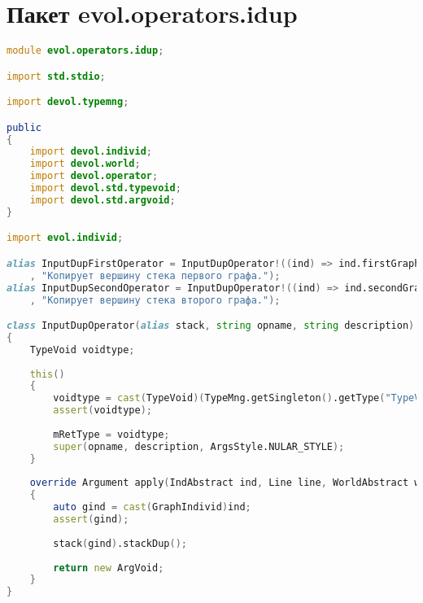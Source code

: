 \documentclass[russian,utf8,emptystyle]{eskdtext}
\begin{document}
\section{Пакет evol.operators.idup}
\begin{lstlisting}[language=D]
module evol.operators.idup;

import std.stdio;

import devol.typemng;

public
{
    import devol.individ;
    import devol.world;
    import devol.operator;
    import devol.std.typevoid;
    import devol.std.argvoid;
}

import evol.individ;

alias InputDupFirstOperator = InputDupOperator!((ind) => ind.firstGraphStack, "idup1"
    , "Копирует вершину стека первого графа.");  
alias InputDupSecondOperator = InputDupOperator!((ind) => ind.secondGraphStack, "idup2"
    , "Копирует вершину стека второго графа.");

class InputDupOperator(alias stack, string opname, string description) : Operator
{
    TypeVoid voidtype;
    
    this()
    {
        voidtype = cast(TypeVoid)(TypeMng.getSingleton().getType("TypeVoid"));
        assert(voidtype);
        
        mRetType = voidtype;
        super(opname, description, ArgsStyle.NULAR_STYLE);
    }
    
    override Argument apply(IndAbstract ind, Line line, WorldAbstract world)
    {
        auto gind = cast(GraphIndivid)ind;
        assert(gind);
        
        stack(gind).stackDup();
        
        return new ArgVoid;
    }   
}
\end{lstlisting}
\end{document}
